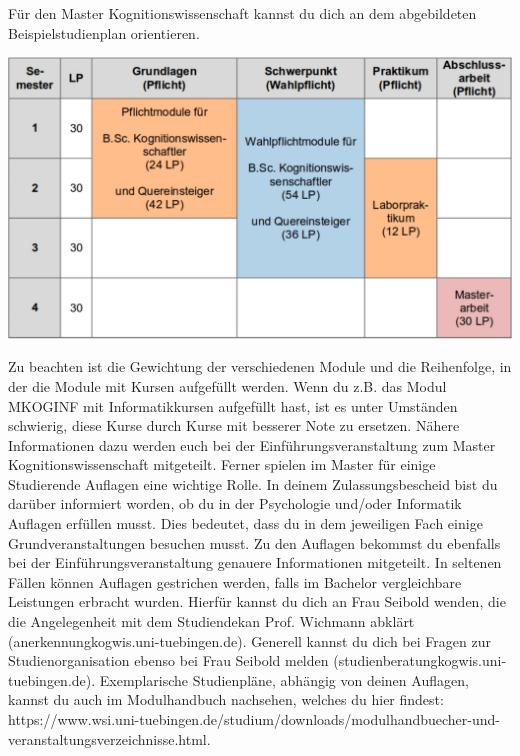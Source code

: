 \ifkogwiss
Für den Master Kognitionswissenschaft kannst du dich an dem abgebildeten Beispielstudienplan orientieren.
\begin{center}
	\includegraphics[width=.8\textwidth]{media/studienplan_kmsc.pdf}
\end{center}
Zu beachten ist die Gewichtung der verschiedenen Module und die Reihenfolge, in der die Module mit Kursen aufgefüllt werden. Wenn
du z.B. das Modul MKOGINF mit Informatikkursen aufgefüllt hast, ist es unter Umständen schwierig, diese Kurse durch Kurse mit
besserer Note zu ersetzen. Nähere Informationen dazu werden euch bei der Einführungsveranstaltung zum Master Kognitionswissenschaft mitgeteilt. Ferner spielen im Master für einige Studierende Auflagen eine wichtige Rolle. In deinem Zulassungsbescheid bist du darüber informiert worden, ob du in der Psychologie und/oder Informatik Auflagen erfüllen musst. Dies bedeutet, dass du in dem jeweiligen Fach einige Grundveranstaltungen besuchen musst. Zu den Auflagen bekommst du ebenfalls bei der Einführungsveranstaltung genauere Informationen mitgeteilt. In seltenen Fällen können Auflagen gestrichen werden, falls im Bachelor vergleichbare Leistungen erbracht wurden. Hierfür kannst du dich an Frau Seibold wenden, die die Angelegenheit mit dem Studiendekan Prof. Wichmann abklärt (anerkennung\At kogwis.uni-tuebingen.de). Generell kannst du dich bei Fragen zur Studienorganisation ebenso bei Frau Seibold melden (studienberatung\At kogwis.uni-tuebingen.de). Exemplarische Studienpläne, abhängig von deinen Auflagen, kannst du auch im Modulhandbuch nachsehen, welches du hier findest: https://www.wsi.uni-tuebingen.de/studium/downloads/modulhandbuecher-und-veranstaltungsverzeichnisse.html.
\fi

